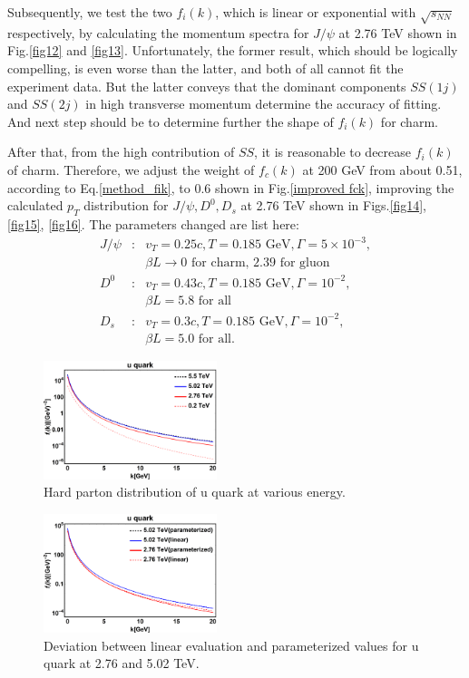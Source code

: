 \documentclass[twocolumn,aps,superscriptaddress,nofootinbib,floatfix]{revtex4}
\begin{document}
Subsequently, we test the two $f_i(k)$, which is linear or exponential with $\sqrt{s_{NN}}$ respectively, by calculating the momentum spectra for $J/\psi$ at 2.76 TeV shown in Fig.\ref{fig12} and \ref{fig13}. Unfortunately, the former result, which should be logically compelling, is even worse than the latter, and both of all cannot fit the experiment data. But the latter conveys that the dominant components $SS(1j)$ and $SS(2j)$ in high transverse momentum determine the accuracy of fitting. And next step should be to determine further the shape of $f_i(k)$ for charm.

After that, from the high contribution of $SS$, it is reasonable to decrease $f_i(k)$ of charm. Therefore, we adjust the weight of $f_c(k)$ at 200 GeV from about 0.51, according to Eq.\ref{method_fik}, to 0.6 shown in Fig.\ref{improved fck}, improving the calculated $p_T$ distribution for $J/\psi, D^0, D_s$ at 2.76 TeV shown in Figs.\ref{fig14}, \ref{fig15}, \ref{fig16}. The parameters changed are list here:
\begin{eqnarray}
	J/\psi&:& v_T=0.25c, T=0.185 \text{ GeV}, \Gamma=5\times 10^{-3}, \\ \nonumber
						&&\beta L\rightarrow \text{0 for charm, 2.39 for gluon}\\
	D^0&:& v_T=0.43c, T=0.185 \text{ GeV}, \Gamma=10^{-2}, \\ \nonumber
						&&\beta L=\text{5.8 for all}\\
	D_s&:& v_T=0.3c, T=0.185\text{ GeV}, \Gamma=10^{-2}, \\ \nonumber
						&& \beta L=\text{5.0 for all}.
\end{eqnarray}

\begin{figure}[H]
	\includegraphics[width=0.45\textwidth]{fiku.png}
	\caption{Hard parton distribution of u quark at various energy.}
	\label{fig7}
\end{figure}

\begin{figure}[H]
	\includegraphics[width=0.45\textwidth]{compareu.png}
	\caption{Deviation between linear evaluation and parameterized values for u quark at 2.76 and 5.02 TeV.}
	\label{fig8}
\end{figure}
\end{document}
